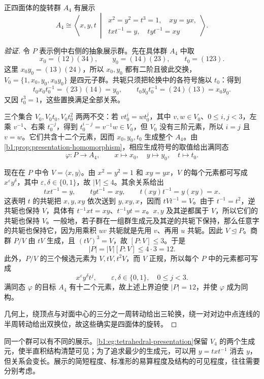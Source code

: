 \begin{example}[正四面体旋转群的展示]\label{b1:eg:tetrahedral-presentation}
	正四面体的旋转群 \(A_4\) 有展示
	\[
		A_4\cong\left\langle x,y,t\ \middle|\
		\begin{gathered}
			x^2=y^2=t^3=1,\quad xy=yx,\\
			txt^{-1}=y,\quad tyt^{-1}=xy
		\end{gathered}\right\rangle.
	\]
\end{example}
\begin{proof}[验证]
	令 \(P\) 表示例中右侧的抽象展示群。先在具体群 \(A_4\) 中取
	\[
		x_0=(12)(34),\qquad y_0=(14)(23),\qquad t_0=(123).
	\]
	这里 \(x_0y_0=(13)(24)\)，所以 \(x_0,y_0\) 都有二阶且彼此交换， \(V_0=\{1,x_0,y_0,x_0y_0\}\) 是四元子群。共轭只须把轮换中的各符号施以 \(t_0\)：得到
	\[
		t_0x_0t_0^{-1}=(23)(14)=y_0, \qquad t_0y_0t_0^{-1}=(24)(13)=x_0y_0.
	\]
	又因 \(t_0^3=1\)，这些置换满足全部关系。

	三个集合 \(V_0,V_0t_0,V_0t_0^2\) 两两不交：若 \(vt_0^i=wt_0^j\)，其中 \(v,w\in V_0\)、\(0\le i,j<3\)，左乘 \(v^{-1}\)、右乘 \(t_0^{-j}\)，得到 \(t_0^{i-j}=v^{-1}w\in V_0\)，但 \(V_0\) 没有三阶元素，所以 \(i=j\) 且 \(v=w\)。它们共含十二个元素，因而 \(x_0,y_0,t_0\) 生成整个 \(A_4\)。由\cref{b1:prop:presentation-homomorphism}，相应生成符号的取值给出满同态
	\[
		\varphi:P\longrightarrow A_4, \qquad x\longmapsto x_0,\quad y\longmapsto y_0,\quad t\longmapsto t_0.
	\]

	现在在 \(P\) 中令 \(V=\langle x,y\rangle\)。由 \(x^2=y^2=1\) 和 \(xy=yx\)，\(V\) 的每个元素都可写成 \(x^\varepsilon y^\delta\)，其中 \(\varepsilon,\delta\in\{0,1\}\)，故 \(|V|\leq4\)。其余关系给出
	\[
		t x t^{-1}=y,\qquad t y t^{-1}=xy,\qquad t(xy)t^{-1}=y(xy)=x.
	\]
	这表明 \(t\) 的共轭把 \(x,y,xy\) 依次送到 \(y,xy,x\)，因而 \(tVt^{-1}=V\)。由于 \(t^{-1}=t^2\)，逆共轭也保持 \(V\)，具体有 \(t^{-1}xt=xy\)、\(t^{-1}yt=x\)。\(x,y\) 及其逆都属于 \(V\)，所以它们的共轭也保持 \(V\)。一般地，若子群在一组群生成元及其逆的共轭下保持，那么任意字的共轭也保持它，因为用乘积 \(uv\) 共轭就是先用 \(v\)、再用 \(u\) 共轭。因此 \(V\trianglelefteq P\)。商群 \(P/V\) 由 \(tV\) 生成，且 \((tV)^3=V\)，故 \([P:V]\leq3\)。于是
	\[
		|P|=|V|[P:V]\leq4\cdot3=12.
	\]
	此外，\(P/V\) 的三个候选元素为 \(V,tV,t^2V\)，而 \(V\) 正规，所以每个 \(P\) 中的元素都可写成
	\[
		x^\varepsilon y^\delta t^j, \qquad \varepsilon,\delta\in\{0,1\},\quad 0\leq j<3.
	\]
	满同态 \(\varphi\) 的目标 \(A_4\) 有十二个元素，故上述上界迫使 \(|P|=12\)，并使 \(\varphi\) 成为同构。

	几何上，绕顶点与对面中心的三分之一周转动给出三轮换，绕一对对边中点连线的半周转动给出双换位，故这些确实是四面体的旋转。
\end{proof}

同一个群可以有不同的展示。\cref{b1:eg:tetrahedral-presentation}保留 \(V_4\) 的两个生成元，使半直积结构清楚可见；为了追求最少的生成元，可以用 \(y=txt^{-1}\) 消去 \(y\)，但关系会变长。展示的简短程度、标准形的易算程度及结构的可见程度，往往需要分别考虑。
